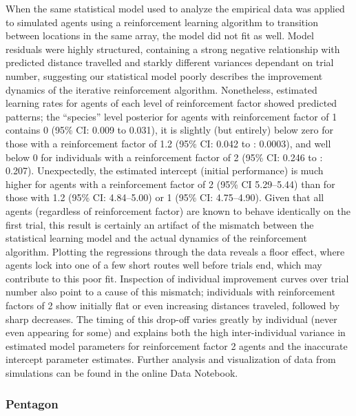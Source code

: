 \documentclass[twoside,12pt,final]{ucthesis-CA2012}
\begin{document}
\begin{ucmainmatter}
When the same statistical model used to analyze the empirical data was applied to simulated agents using a reinforcement learning algorithm to transition between locations in the same array, the model did not fit as well. Model residuals were highly structured, containing a strong negative relationship with predicted distance travelled and starkly different variances dependant on trial number, suggesting our statistical model poorly describes the improvement dynamics of the iterative reinforcement algorithm. Nonetheless, estimated learning rates for agents of each level of reinforcement factor showed predicted patterns; the ``species'' level posterior for agents with reinforcement factor of 1 contains 0 (95\% CI: 0.009 to 0.031), it is slightly (but entirely) below zero for those with a reinforcement factor of 1.2 (95\% CI: 0.042 to : 0.0003), and well below 0 for individuals with a reinforcement factor of 2 (95\% CI: 0.246 to : 0.207). Unexpectedly, the estimated intercept (initial performance) is much higher for agents with a reinforcement factor of 2 (95\% CI 5.29--5.44) than for those with 1.2 (95\% CI: 4.84--5.00) or 1 (95\% CI: 4.75--4.90). Given that all agents (regardless of reinforcement factor) are known to behave identically on the first trial, this result is certainly an artifact of the mismatch between the statistical learning model and the actual dynamics of the reinforcement algorithm. Plotting the regressions through the data reveals a floor effect, where agents lock into one of a few short routes well before trials end, which may contribute to this poor fit. Inspection of individual improvement curves over trial number also point to a cause of this mismatch; individuals with reinforcement factors of 2 show initially flat or even increasing distances traveled, followed by sharp decreases. The timing of this drop-off varies greatly by individual (never even appearing for some) and explains both the high inter-individual variance in estimated model parameters for reinforcement factor 2 agents and the inaccurate intercept parameter estimates. Further analysis and visualization of data from simulations can be found in the online Data Notebook.

\hypertarget{pentagon}{%
\subsubsection{Pentagon}\label{pentagon}}


\end{ucmainmatter}
\end{document}
